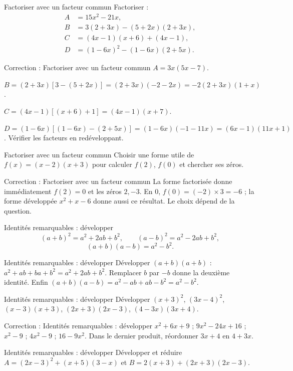 \documentclass[aspectratio=169,10pt]{beamer}
\providecommand{\D}{\mathbb{D}}
\begin{document}
\begin{frame}{Factoriser avec un facteur commun}
Factoriser :
\[\begin{aligned}
A&=15x^2-21x,\\B&=3(2+3x)-(5+2x)(2+3x),\\
C&=(4x-1)(x+6)+(4x-1),\\D&=(1-6x)^2-(1-6x)(2+5x).
\end{aligned}\]
\end{frame}
\begin{frame}{Correction : Factoriser avec un facteur commun}
\(A=3x(5x-7)\).

\(B=(2+3x)[3-(5+2x)]=(2+3x)(-2-2x)=-2(2+3x)(1+x)\).

\(C=(4x-1)[(x+6)+1]=(4x-1)(x+7)\).

\(D=(1-6x)[(1-6x)-(2+5x)]=(1-6x)(-1-11x)=(6x-1)(11x+1)\).
Vérifier les facteurs en redéveloppant.
\end{frame}
\begin{frame}{Factoriser avec un facteur commun}
Choisir une forme utile de \(f(x)=(x-2)(x+3)\) pour calculer \(f(2)\), \(f(0)\) et chercher ses zéros.
\end{frame}
\begin{frame}{Correction : Factoriser avec un facteur commun}
La forme factorisée donne immédiatement \(f(2)=0\) et les zéros \(2,-3\). En \(0\), \(f(0)=(-2)\times3=-6\) ; la forme développée \(x^2+x-6\) donne aussi ce résultat. Le choix dépend de la question.
\end{frame}
\begin{frame}{Identités remarquables : développer}
\[(a+b)^2=a^2+2ab+b^2,\qquad(a-b)^2=a^2-2ab+b^2,\]
\[(a+b)(a-b)=a^2-b^2.\]
\end{frame}
\begin{frame}{Identités remarquables : développer}
Développer \((a+b)(a+b)\) : \(a^2+ab+ba+b^2=a^2+2ab+b^2\). Remplacer \(b\) par \(-b\) donne la deuxième identité. Enfin \((a+b)(a-b)=a^2-ab+ab-b^2=a^2-b^2\).
\end{frame}
\begin{frame}{Identités remarquables : développer}
Développer \((x+3)^2\), \((3x-4)^2\), \((x-3)(x+3)\), \((2x+3)(2x-3)\), \((4-3x)(3x+4)\).
\end{frame}
\begin{frame}{Correction : Identités remarquables : développer}
\(x^2+6x+9\) ; \(9x^2-24x+16\) ; \(x^2-9\) ; \(4x^2-9\) ; \(16-9x^2\). Dans le dernier produit, réordonner \(3x+4\) en \(4+3x\).
\end{frame}
\begin{frame}{Identités remarquables : développer}
Développer et réduire \(A=(2x-3)^2+(x+5)(3-x)\) et \(B=2(x+3)+(2x+3)(2x-3)\).
\end{frame}
\end{document}
